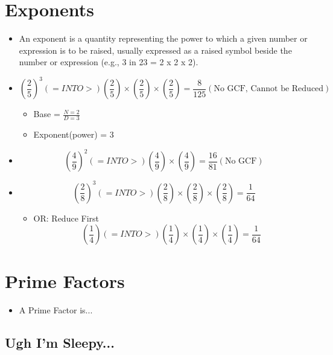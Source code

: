 \documentclass[]{article}
\begin{document}
\section{Exponents}
\begin{itemize}
	\item An exponent is a quantity representing the power to which a given number or expression is to be raised, usually expressed as a raised symbol beside the number or expression (e.g., 3 in 23 = 2 x 2 x 2).
	\item \begin{equation}
		(\frac{2}{5}) ^3 (=INTO>) ( \frac{2}{5} ) \times ( \frac{2}{5} ) \times ( \frac{2}{5} ) = \frac{8}{125} (\text{No GCF, Cannot be Reduced})
	\end{equation}
	\begin{itemize}
				\item Base = $ \frac{N=2}{D=3} $
				\item Exponent(power) = 3
	\end{itemize}
	\item \begin{equation}
		(\frac{4}{9})^2 (=INTO>) (\frac{4}{9}) \times (\frac{4}{9}) = \frac{16}{81} (\text{No GCF})
	\end{equation}
	\item \begin{equation}
		(\frac{2}{8})^3 (=INTO>) (\frac{2}{8}) \times (\frac{2}{8}) \times (\frac{2}{8}) = \frac{1}{64}
	\end{equation}
	\begin{itemize}
		\item OR: Reduce First
		\begin{equation}
			(\frac{1}{4}) (=INTO>) (\frac{1}{4}) \times (\frac{1}{4}) \times (\frac{1}{4}) = \frac{1}{64}
		\end{equation}
	\end{itemize}
\end{itemize}

\section{Prime Factors}
\begin{itemize}
	\item A Prime Factor is...
\end{itemize}

\subsection{Ugh I'm Sleepy...}
\end{document}
